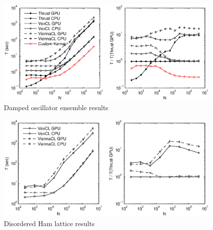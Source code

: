 \documentclass[1p]{elsarticle}
\begin{document}
\begin{figure}
    \begin{center}
	\includegraphics[width=\textwidth]{data/damped_oscillator/perfcmp}
    \end{center}
    \caption{Damped oscillator ensemble results}
    \label{fig:phase:perf}
\end{figure}

\begin{figure}
    \begin{center}
	\includegraphics[width=\textwidth]{data/disordered_ham_lattice/perfcmp}
    \end{center}
    \caption{Disordered Ham lattice results}
    \label{fig:phase:perf}
\end{figure}
\end{document}

